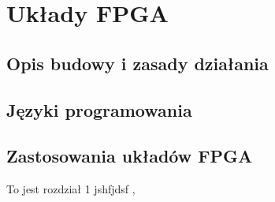 \documentclass[document.tex]{subfiles}
\begin{document}
\chapter{Układy FPGA}
\section{Opis budowy i zasady działania}
\section{Języki programowania}
\section{Zastosowania układów FPGA}
To jest rozdział 1
jshfjdsf \cite{wikipedia1},\cite{goossens93}
\cite{wikipedia2}
\end{document}
